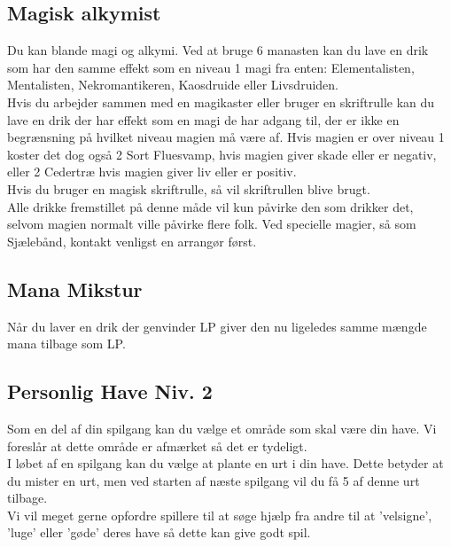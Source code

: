 \subsection{Magisk alkymist}
Du kan blande magi og alkymi. Ved at bruge 6 manasten kan du lave en drik som har den samme effekt som en niveau 1 magi fra enten: Elementalisten, Mentalisten, Nekromantikeren, Kaosdruide eller Livsdruiden.\\
Hvis du arbejder sammen med en magikaster eller bruger en skriftrulle kan du lave en drik der har effekt som en magi de har adgang til, der er ikke en begrænsning på hvilket niveau magien må være af. Hvis magien er over niveau 1 koster det dog også 2 Sort Fluesvamp, hvis magien giver skade eller er negativ, eller 2 Cedertræ hvis magien giver liv eller er positiv.\\
Hvis du bruger en magisk skriftrulle, så vil skriftrullen blive brugt.\\
Alle drikke fremstillet på denne måde vil kun påvirke den som drikker det, selvom magien normalt ville påvirke flere folk. Ved specielle magier, så som Sjælebånd, kontakt venligst en arrangør først.\\

\subsection{Mana Mikstur}
Når du laver en drik der genvinder LP giver den nu ligeledes samme mængde mana tilbage som LP.\\

\subsection{Personlig Have Niv. 2}
Som en del af din spilgang kan du vælge et område som skal være din have. Vi foreslår at dette område er afmærket så det er tydeligt.\\
I løbet af en spilgang kan du vælge at plante en urt i din have. Dette betyder at du mister en urt, men ved starten af næste spilgang vil du få 5 af denne urt tilbage.\\
Vi vil meget gerne opfordre spillere til at søge hjælp fra andre til at 'velsigne', 'luge' eller 'gøde' deres have så dette kan give godt spil.\\
